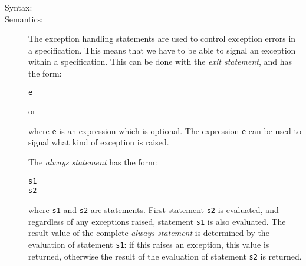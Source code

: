\documentclass[\pformat,12pt]{article}
\begin{document}
\begin{description}
\item[Syntax:]






\item[Semantics:] The exception handling statements are used to control
  exception errors in a specification. This means that we have to be
  able to signal an exception within a specification. This can be done with
  the {\it exit statement}, and has the form:
  \begin{alltt}
     e
  \end{alltt}
  or
  \begin{alltt}
  \end{alltt}
  where {\tt e} is an expression which is optional. The expression {\tt e}
  can be used to signal what kind of exception is raised.

  The {\it always statement\/} has the form:
  \begin{alltt}
     s1 
    s2
  \end{alltt}
  where {\tt s1} and {\tt s2} are statements. First statement {\tt s2} is
  evaluated, and regardless of any exceptions raised, statement {\tt s1} is
  also evaluated. The result value of the complete {\it always statement\/}
  is determined by the evaluation of statement {\tt s1}: if this raises an
  exception, this value is returned, otherwise the result of the evaluation
  of statement {\tt s2} is returned.


\end{description}
\end{document}
